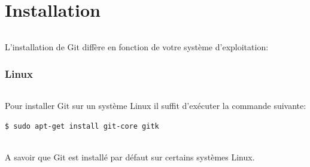 \documentclass[french, a4paper, 12pt, titlepage]{article}
\begin{document}
%
%
%

\newpage
\part{Installation}
\paragraph{}L'installation de Git diffère en fonction de votre système d'exploitation:
\section{Linux}
\paragraph{} Pour installer Git sur un système Linux il suffit d'exécuter la commande suivante:
\begin{lstlisting}
$ sudo apt-get install git-core gitk
\end{lstlisting}
\paragraph{}A savoir que Git est installé par défaut sur certains systèmes Linux.
\end{document}
